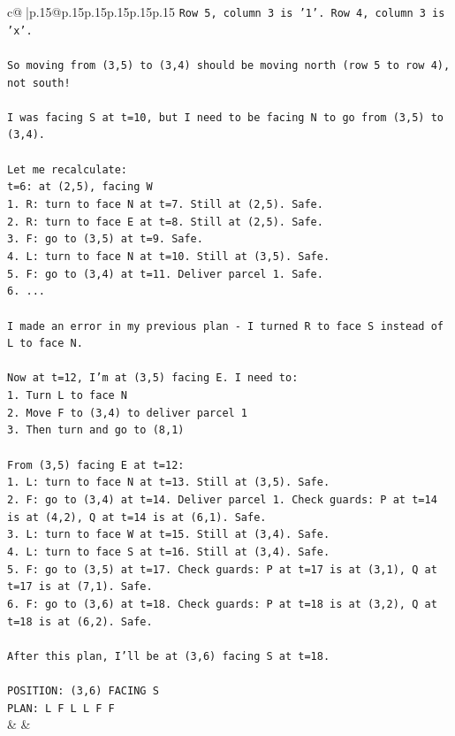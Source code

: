 \documentclass{article}
\begin{document}
{\begin{supertabular}{c@{$\;$}|p{.15\linewidth}@{}p{.15\linewidth}p{.15\linewidth}p{.15\linewidth}p{.15\linewidth}p{.15\linewidth}}
{{{\texttt{Row 5, column 3 is '1'. Row 4, column 3 is 'x'.} \\
\\ 
\texttt{So moving from (3,5) to (3,4) should be moving north (row 5 to row 4), not south!} \\
\\ 
\texttt{I was facing S at t=10, but I need to be facing N to go from (3,5) to (3,4).} \\
\\ 
\texttt{Let me recalculate:} \\
\texttt{t=6: at (2,5), facing W} \\
\texttt{1. R: turn to face N at t=7. Still at (2,5). Safe.} \\
\texttt{2. R: turn to face E at t=8. Still at (2,5). Safe.} \\
\texttt{3. F: go to (3,5) at t=9. Safe.} \\
\texttt{4. L: turn to face N at t=10. Still at (3,5). Safe.} \\
\texttt{5. F: go to (3,4) at t=11. Deliver parcel 1. Safe.} \\
\texttt{6. ...} \\
\\ 
\texttt{I made an error in my previous plan {-} I turned R to face S instead of L to face N.} \\
\\ 
\texttt{Now at t=12, I'm at (3,5) facing E. I need to:} \\
\texttt{1. Turn L to face N} \\
\texttt{2. Move F to (3,4) to deliver parcel 1} \\
\texttt{3. Then turn and go to (8,1)} \\
\\ 
\texttt{From (3,5) facing E at t=12:} \\
\texttt{1. L: turn to face N at t=13. Still at (3,5). Safe.} \\
\texttt{2. F: go to (3,4) at t=14. Deliver parcel 1. Check guards: P at t=14 is at (4,2), Q at t=14 is at (6,1). Safe.} \\
\texttt{3. L: turn to face W at t=15. Still at (3,4). Safe.} \\
\texttt{4. L: turn to face S at t=16. Still at (3,4). Safe.} \\
\texttt{5. F: go to (3,5) at t=17. Check guards: P at t=17 is at (3,1), Q at t=17 is at (7,1). Safe.} \\
\texttt{6. F: go to (3,6) at t=18. Check guards: P at t=18 is at (3,2), Q at t=18 is at (6,2). Safe.} \\
\\ 
\texttt{After this plan, I'll be at (3,6) facing S at t=18.} \\
\\ 
\texttt{POSITION: (3,6) FACING S} \\
\texttt{PLAN: L F L L F F} \\
            }
        }
    }
    & & \\ \\


\end{supertabular}}
\end{document}
